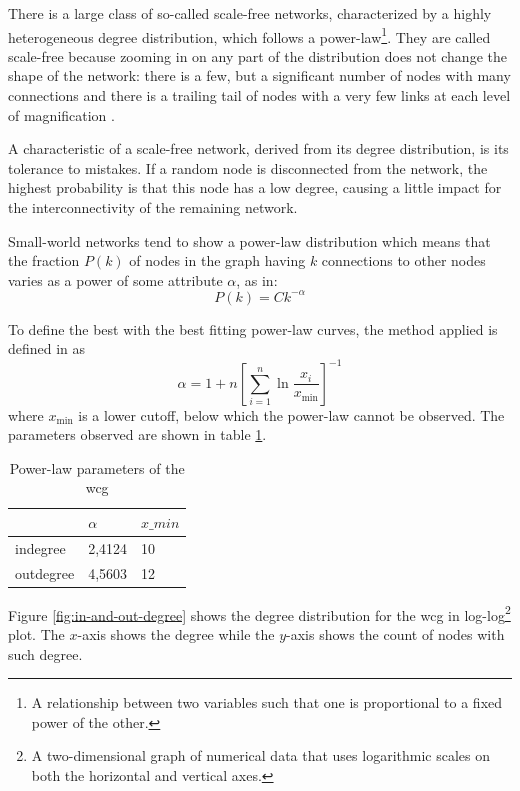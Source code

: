 There is a large class of so-called scale-free networks, characterized by a highly heterogeneous degree distribution, which follows a power-law\footnote{A relationship between two variables such that one is proportional to a fixed power of the other.}. They are called scale-free because zooming in on any part of the distribution does not change the shape of the network: there is a few, but a significant number of nodes with many connections and there is a trailing tail of nodes with a very few links at each level of magnification \cite{steyvers2005large}.


A %
characteristic of a scale-free network, derived from its degree distribution, is its tolerance to mistakes. If a random node is disconnected from the network, the highest probability is that this node has a low degree, causing a little impact for the interconnectivity of the remaining network.


Small-world networks tend to show a power-law distribution which means that the fraction $P(k)$ of nodes in the graph having $k$ connections to other nodes varies as a power of some attribute $\alpha$, as in: 
\begin{equation}
P(k)=Ck^{-\alpha}
\end{equation}


To define the best with the best fitting power-law curves, the method applied is defined in \cite{clauset2009power} as \begin{equation}
\alpha = 1 +n\left[\sum_{i=1}^n\ln\frac{x_i}{x_{\min}}\right]^{-1}
\end{equation}
where $x_{\min}$ is a lower cutoff, below which the power-law cannot be observed. The parameters observed are shown in table \ref{tab:power-law-params}.

\begin{table}[ht!]
\centering
\begin{tabular}{@{}lll@{}}
\toprule
           & $\alpha$ & $x\_{min}$ \\ \midrule
indegree  & 2,4124 & 10         \\
outdegree & 4,5603 & 12         \\ \bottomrule
\end{tabular}
\caption{Power-law parameters of the \gls{wcg}}
\label{tab:power-law-params}
\end{table}


Figure \ref{fig:in-and-out-degree} shows the degree distribution for the \gls{wcg} in log-log\footnote{
A two-dimensional graph of numerical data that uses logarithmic scales on both the horizontal and vertical axes. 
} plot. The $x$-axis shows the degree while the $y$-axis shows the count of nodes with such degree. 

